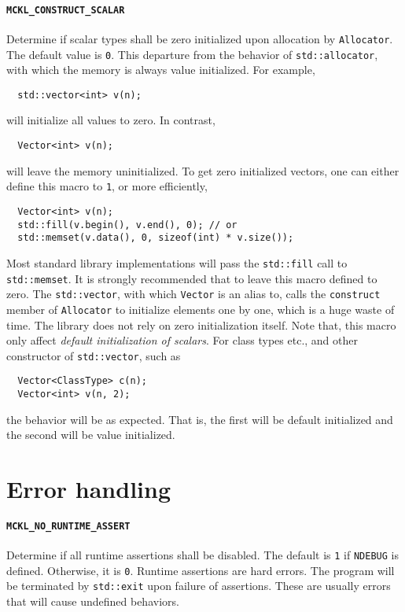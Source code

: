 \paragraph{\texttt{MCKL\_CONSTRUCT\_SCALAR}} Determine if scalar types shall be
zero initialized upon allocation by \verb|Allocator|. The default value is
\verb|0|. This departure from the behavior of \verb|std::allocator|, with which
the memory is always value initialized. For example,
\begin{Verbatim}
  std::vector<int> v(n);
\end{Verbatim}
will initialize all values to zero. In contrast,
\begin{Verbatim}
  Vector<int> v(n);
\end{Verbatim}
will leave the memory uninitialized. To get zero initialized vectors, one can
either define this macro to \verb|1|, or more efficiently,
\begin{Verbatim}
  Vector<int> v(n);
  std::fill(v.begin(), v.end(), 0); // or
  std::memset(v.data(), 0, sizeof(int) * v.size());
\end{Verbatim}
Most standard library implementations will pass the \verb|std::fill| call to
\verb|std::memset|. It is strongly recommended that to leave this macro
defined to zero. The \verb|std::vector|, with which \verb|Vector| is an alias
to, calls the \verb|construct| member of \verb|Allocator| to initialize
elements one by one, which is a huge waste of time. The library does not rely
on zero initialization itself. Note that, this macro only affect
\emph{default initialization of scalars}. For class types etc., and other
constructor of \verb|std::vector|, such as
\begin{Verbatim}
  Vector<ClassType> c(n);
  Vector<int> v(n, 2);
\end{Verbatim}
the behavior will be as expected. That is, the first will be default
initialized and the second will be value initialized.

\section{Error handling}
\label{sec:Error handling}

\paragraph{\texttt{MCKL\_NO\_RUNTIME\_ASSERT}} Determine if all runtime
assertions shall be disabled. The default is \verb|1| if \verb|NDEBUG| is
defined. Otherwise, it is \verb|0|. Runtime assertions are hard errors. The
program will be terminated by \verb|std::exit| upon failure of assertions.
These are usually errors that will cause undefined behaviors.

